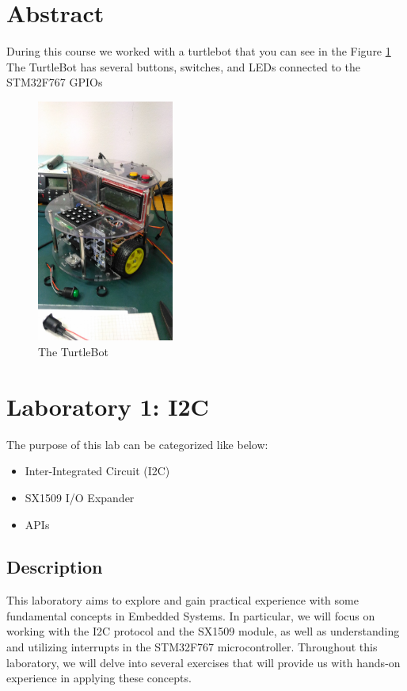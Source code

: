 \documentclass[english]{article}
\begin{document}
\begin{titlepage}
\end{titlepage}

\tableofcontents
\newpage
\section{Abstract}
During this course we worked with a turtlebot that you can see in the Figure \ref{fig:turtlebot}
The TurtleBot has several buttons, switches, and LEDs connected to the STM32F767 GPIOs
\begin{figure}[!h]
	\centering
	\includegraphics[width=0.4\textwidth]{figures/turtlebot_1.jpg}
	\caption{The TurtleBot}
	\label{fig:turtlebot}
\end{figure}

\newpage
\section{Laboratory 1: I2C}
The purpose of this lab can be categorized like below:
\begin{itemize}
    \item Inter-Integrated Circuit (I2C)
    \item SX1509 I/O Expander
    \item APIs
\end{itemize}

\subsection{Description}
This laboratory aims to explore and gain practical experience with some fundamental concepts in Embedded Systems.
 In particular, we will focus on working with the I2C protocol and the SX1509 module, as well as understanding 
and utilizing interrupts in the STM32F767 microcontroller. Throughout this laboratory, we will delve into several exercises that will provide us with hands-on experience in applying these concepts.
\end{document}
